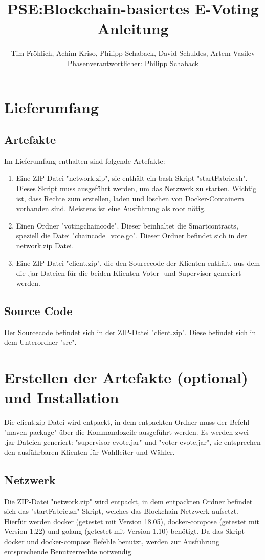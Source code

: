 \documentclass[parskip=full]{scrartcl}
\title{
	PSE:Blockchain-basiertes E-Voting \\
	Anleitung
}
\author{Tim Fröhlich, Achim Kriso, Philipp Schaback, David Schuldes, Artem Vasilev\\ Phasenverantwortlicher: Philipp Schaback}
\begin{document}
	\clearpage
	\maketitle
	\newpage
	
	\tableofcontents
	\newpage
	
	\section{Lieferumfang}
	\subsection{Artefakte}
	Im Lieferumfang enthalten sind folgende Artefakte:
	\begin{enumerate}
		\item Eine ZIP-Datei "network.zip", sie enthält ein bash-Skript "startFabric.sh". Dieses Skript muss ausgeführt werden, um das Netzwerk zu starten. Wichtig ist, dass Rechte zum erstellen, laden und löschen von Docker-Containern vorhanden sind. Meistens ist eine Ausführung als root nötig.
		\item Einen Ordner "votingchaincode". Dieser beinhaltet die Smartcontracts, speziell die Datei "chaincode\_vote.go". Dieser Ordner befindet sich in der network.zip Datei.
		\item Eine ZIP-Datei "client.zip", die den Sourcecode der Klienten enthält, aus dem die .jar Dateien für die beiden Klienten Voter- und Supervisor generiert werden.
	\end{enumerate}

	\subsection{Source Code}
	
	Der Sourcecode befindet sich in der ZIP-Datei "client.zip". Diese befindet sich in dem Unterordner "src".
	\section{Erstellen der Artefakte (optional) und Installation}

	
	Die client.zip-Datei wird entpackt, in dem entpackten Ordner muss der Befehl "maven package" über die Kommandozeile ausgeführt werden. Es werden zwei .jar-Dateien generiert: "supervisor-evote.jar" und "voter-evote.jar", sie entsprechen den ausführbaren Klienten für Wahlleiter und Wähler.
	\subsection{Netzwerk}
	Die ZIP-Datei "network.zip" wird entpackt, in dem entpackten Ordner befindet sich das "startFabric.sh" Skript, welches das Blockchain-Netzwerk aufsetzt. Hierfür werden docker (getestet mit Version 18.05), docker-compose (getestet mit Version 1.22) und golang (getestet mit Version 1.10) benötigt.
	Da das Skript docker und docker-compose Befehle benutzt, werden zur Ausführung entsprechende Benutzerrechte notwendig.
\end{document}
